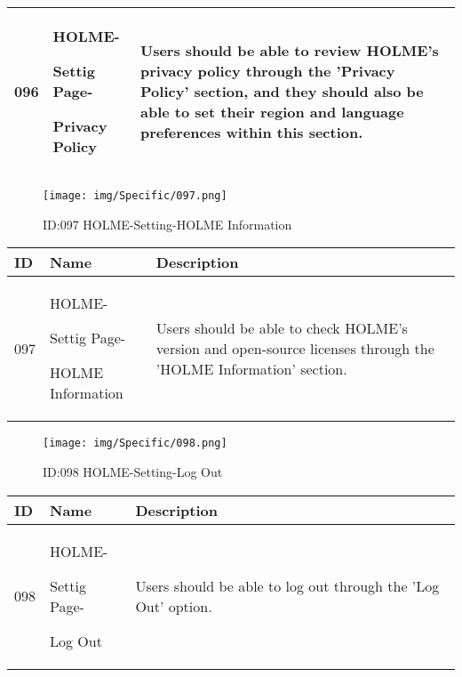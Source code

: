 \documentclass[conference]{IEEEtran}
\begin{document}
\begin{enumerate}
\begin{table}[h]
\begin{tabular}{|p{1cm}|p{1.8cm}|p{5.0cm}|}
         096 \par  & HOLME-\par Settig Page- \par Privacy Policy& 
       	Users should be able to review HOLME's privacy policy through the 'Privacy Policy' section, and they should also be able to set their region and language preferences within this section.
         \\ \hline
    \end{tabular}
\end{table}
\begin{figure}[h]
\centering                                         
\texttt{[image: img/Specific/097.png]}
\caption{ID:097 HOLME-Setting-HOLME Information}
\end{figure}
\begin{table}[h]
\def\arraystretch{1.2} \small
    \begin{tabular}{|p{1cm}|p{1.8cm}|p{5.0cm}|}
        \hline
        ID & Name & Description\\ \hline
         097 \par  & HOLME-\par Settig Page- \par HOLME Information& 
       	Users should be able to check HOLME's version and open-source licenses through the 'HOLME Information' section.
         \\ \hline
    \end{tabular}
\end{table}
\clearpage


\begin{figure}[h]
\centering                                         
\texttt{[image: img/Specific/098.png]}
\caption{ID:098 HOLME-Setting-Log Out}
\end{figure}
\begin{table}[h]
\def\arraystretch{1.2} \small
    \begin{tabular}{|p{1cm}|p{1.8cm}|p{5.0cm}|}
        \hline
        ID & Name & Description\\ \hline
         098 \par  & HOLME-\par Settig Page- \par Log Out& 
       	Users should be able to log out through the 'Log Out' option.
         \\ \hline
    \end{tabular}
\end{table}


\end{enumerate}
\end{document}
